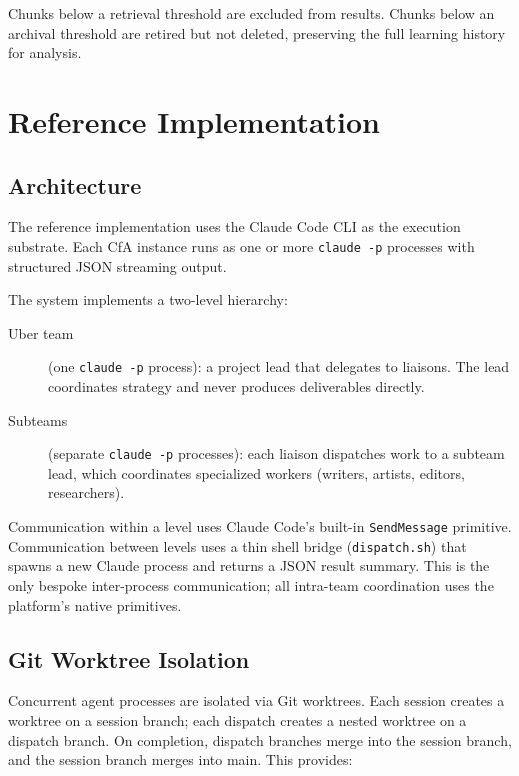 \documentclass[11pt,a4paper]{article}
\begin{document}
Chunks below a retrieval threshold are excluded from results. Chunks
below an archival threshold are retired but not deleted, preserving
the full learning history for analysis.

\section{Reference Implementation}
\label{sec:implementation}

\subsection{Architecture}

The reference implementation uses the Claude Code CLI as the execution
substrate. Each CfA instance runs as one or more \texttt{claude -p}
processes with structured JSON streaming output.

The system implements a two-level hierarchy:

\begin{description}
    \item[Uber team] (one \texttt{claude -p} process): a project lead
    that delegates to liaisons. The lead coordinates strategy and never
    produces deliverables directly.

    \item[Subteams] (separate \texttt{claude -p} processes): each
    liaison dispatches work to a subteam lead, which coordinates
    specialized workers (writers, artists, editors, researchers).
\end{description}

Communication within a level uses Claude Code's built-in
\texttt{SendMessage} primitive. Communication between levels uses a
thin shell bridge (\texttt{dispatch.sh}) that spawns a new Claude
process and returns a JSON result summary. This is the only bespoke
inter-process communication; all intra-team coordination uses the
platform's native primitives.

\subsection{Git Worktree Isolation}

Concurrent agent processes are isolated via Git worktrees. Each
session creates a worktree on a session branch; each dispatch
creates a nested worktree on a dispatch branch. On completion,
dispatch branches merge into the session branch, and the session
branch merges into main. This provides:
\end{document}
